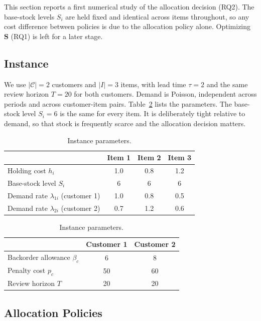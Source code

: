 \documentclass[11pt, a4paper]{article}
\theoremstyle{definition}
\theoremstyle{remark}
\begin{document}
This section reports a first numerical study of the allocation decision (RQ2). The base-stock levels $S_i$ are held fixed and identical across items throughout, so any cost difference between policies is due to the allocation policy alone. Optimizing $\mathbf{S}$ (RQ1) is left for a later stage.

\subsection{Instance}

We use $|\mathcal{C}| = 2$ customers and $|I| = 3$ items, with lead time $\tau = 2$ and the same review horizon $T = 20$ for both customers. Demand is Poisson, independent across periods and across customer-item pairs. Table~\ref{tab:instance} lists the parameters. The base-stock level $S_i = 6$ is the same for every item. It is deliberately tight relative to demand, so that stock is frequently scarce and the allocation decision matters.

\begin{table}[H]
    \centering
    \caption{Instance parameters.}
    \label{tab:instance}
    \begin{tabular}{lccc}
        \toprule
        & Item 1 & Item 2 & Item 3 \\
        \midrule
        Holding cost $h_i$ & 1.0 & 0.8 & 1.2 \\
        Base-stock level $S_i$ & 6 & 6 & 6 \\
        Demand rate $\lambda_{1i}$ (customer 1) & 1.0 & 0.8 & 0.5 \\
        Demand rate $\lambda_{2i}$ (customer 2) & 0.7 & 1.2 & 0.6 \\
        \bottomrule
    \end{tabular}

    \vspace{0.8em}

    \begin{tabular}{lcc}
        \toprule
        & Customer 1 & Customer 2 \\
        \midrule
        Backorder allowance $\beta_c$ & 6 & 8 \\
        Penalty cost $p_c$ & 50 & 60 \\
        Review horizon $T$ & 20 & 20 \\
        \bottomrule
    \end{tabular}
\end{table}

\subsection{Allocation Policies}
\end{document}
